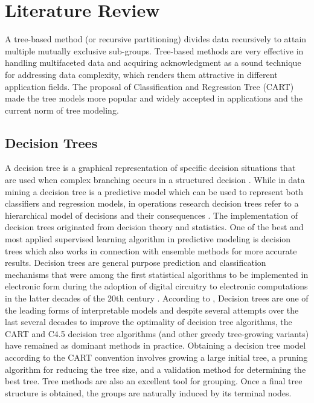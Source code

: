 
\chapter{Literature Review}\label{Literature Review}

A tree-based method (or recursive partitioning) divides data recursively to attain multiple mutually exclusive sub-groups. Tree-based methods are very effective in handling multifaceted data and acquiring acknowledgment as a sound technique for addressing data complexity, which renders them attractive in different application fields. The proposal of Classification and Regression Tree (CART) \citep{breiman1984classification} made the tree models more popular and widely accepted in applications and the current norm of tree modeling. %

\section{Decision Trees}
A decision tree is a graphical representation of specific decision situations that are used when complex branching occurs in a structured decision \citep{njoku2019decision}. While in data mining a decision tree is a predictive model which can be used to represent both classifiers and regression models, in operations research decision trees refer to a hierarchical model of decisions and their consequences \citep{maimon2014data}. The implementation of decision trees originated from decision theory and statistics. One of the best and most applied supervised learning algorithm in predictive modeling is decision trees which also works in connection with ensemble methods for more accurate results. Decision trees are general purpose prediction and classification mechanisms that were among the first statistical algorithms to be implemented in electronic form during the adoption of digital circuitry to electronic computations in the latter decades of the 20th century \citep{de2013decision}. According to \cite{hu2019optimal}, Decision trees are one of the leading forms of interpretable models and despite several attempts over the last several decades to improve the optimality of decision tree algorithms, the CART \citep{breiman1984classification} and C4.5 \citep{quinlan1993program} decision tree algorithms (and other greedy tree-growing variants) have remained as dominant methods in practice. Obtaining a decision tree model according to the CART \citep{breiman1984classification} convention involves growing a large initial tree, a pruning algorithm for reducing the tree size, and a validation method for determining the best tree. Tree methods are also an excellent tool for grouping. Once a final tree structure is obtained, the groups are naturally induced by its terminal nodes.

